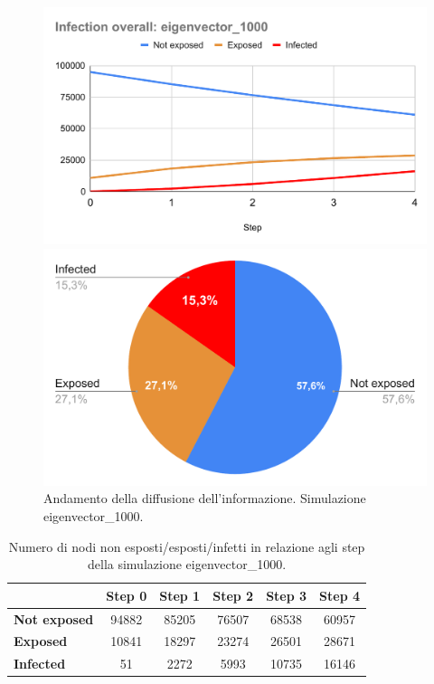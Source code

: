             \begin{figure}[H]
                \centering
                \begin{minipage}[c]{0.55\textwidth}
                    \includegraphics[width=\textwidth]{resources/charts/Infection overall_ eigenvector_1000.pdf}
                \end{minipage}
                \hfill
                \begin{minipage}[c]{0.44\textwidth}
                    \includegraphics[width=\textwidth]{resources/charts/pie_eig_1000.pdf}
                \end{minipage}
                \caption{Andamento della diffusione dell'informazione. Simulazione eigenvector\_1000.}
            \end{figure}
            
        \begin{table}[H]
            \centering
            \begin{tabular}{l|c|c|c|c|c}
                        & Step 0 & Step 1 & Step 2 & Step 3 & Step 4 \\ \hline
            \textbf{Not exposed} & 94882  & 85205  & 76507  & 68538  & 60957  \\ \hline
            \textbf{Exposed}     & 10841  & 18297  & 23274  & 26501  & 28671  \\ \hline
            \textbf{Infected}    & 51     & 2272   & 5993   & 10735  & 16146  \\
            \end{tabular}
            \caption{Numero di nodi non esposti/esposti/infetti in relazione agli step della simulazione eigenvector\_1000.}
        \end{table}
        
